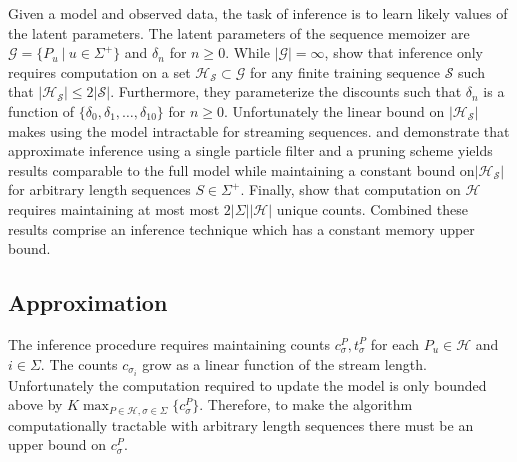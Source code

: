 Given a model and observed data,  the task of inference is to learn likely values of the latent parameters.  The latent parameters of the sequence memoizer are  $\mathcal{G} = \{P_u \ | \ u \in \Sigma^{+} \}$ and $\delta_n$ for $n \geq 0$.  While $| \mathcal{G}| = \infty$, \citep{Wood2009} show that inference only requires computation on a set $\mathcal{H_\mathcal{S}} \subset \mathcal{G}$ for any finite training sequence $\mathcal{S}$ such that $|\mathcal{H}_\mathcal{S} | \leq 2 |\mathcal{S}|$.  Furthermore, they parameterize the discounts such that $\delta_n$ is a function of $\{\delta_0, \delta_1, \ldots, \delta_{10} \}$ for $n \geq 0$.   Unfortunately the linear bound on $|\mathcal{H}_\mathcal{S}|$ makes using the model intractable for streaming sequences. \citep{Bartlett2010} and \citep{Gasthaus2010} demonstrate that approximate inference using a single particle filter and a pruning scheme yields results comparable to the full model while maintaining a constant bound on$| \mathcal{H}_\mathcal{S}| $ for arbitrary length sequences $S \in \Sigma^{+}$.  Finally, \cite{Gasthaus2011} show that computation on $\mathcal{H}$ requires maintaining at most most $2|\Sigma| |\mathcal{H}|$ unique counts.  Combined these results comprise an inference technique which has a constant memory upper bound.

%
\subsection{Approximation}

The inference procedure requires maintaining counts $c^P_\sigma,t^P_\sigma$ for each $P_u \in \mathcal{H}$ and $i \in \Sigma$.  The counts $c_{\sigma_i}$ grow as a linear function of the stream length.  Unfortunately the computation required to update the model is only bounded above by $K \max_{P \in \mathcal{H}, \sigma \in \Sigma} \{ c^P_\sigma \}$.  Therefore, to make the algorithm computationally tractable with arbitrary length sequences there must be an upper bound on $c^P_\sigma$.  


